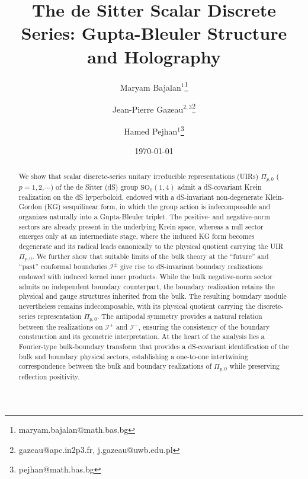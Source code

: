 \documentclass[aps,twocolumn,nofootinbib]{revtex4}
\begin{document}
\title{The de Sitter Scalar Discrete Series: Gupta-Bleuler Structure and Holography}


\author{Maryam Bajalan$^{1}$\footnote{maryam.bajalan@math.bas.bg}}

\author{Jean-Pierre Gazeau$^{2,3}$\footnote{gazeau@apc.in2p3.fr, j.gazeau@uwb.edu.pl}}

\author{Hamed Pejhan$^{1}$\footnote{pejhan@math.bas.bg}}




\date{\today}


\begin{abstract}
    {We show that scalar discrete-series unitary irreducible representations (UIRs) $\Pi_{p,0}$ ($p=1,2,\cdots$) of the de Sitter (dS) group $\mathrm{SO}_0(1,4)$ admit a dS-covariant Krein realization on the dS hyperboloid, endowed with a dS-invariant non-degenerate Klein-Gordon (KG) sesquilinear form, in which the group action is indecomposable and organizes naturally into a Gupta-Bleuler triplet. The positive- and negative-norm sectors are already present in the underlying Krein space, whereas a null sector emerges only at an intermediate stage, where the induced KG form becomes degenerate and its radical leads canonically to the physical quotient carrying the UIR $\Pi_{p,0}$. We further show that suitable limits of the bulk theory at the ``future'' and ``past'' conformal boundaries ${\mathcal{I}}^\pm$ give rise to dS-invariant boundary realizations endowed with induced kernel inner products. While the bulk negative-norm sector admits no independent boundary counterpart, the boundary realization retains the physical and gauge structures inherited from the bulk. The resulting boundary module nevertheless remains indecomposable, with its physical quotient carrying the discrete-series representation $\Pi_{p,0}$. The antipodal symmetry provides a natural relation between the realizations on ${\mathcal{I}}^+$ and ${\mathcal{I}}^-$, ensuring the consistency of the boundary construction and its geometric interpretation. At the heart of the analysis lies a Fourier-type bulk-boundary transform that provides a dS-covariant identification of the bulk and boundary physical sectors, establishing a one-to-one intertwining correspondence between the bulk and boundary realizations of $\Pi_{p,0}$ while preserving reflection positivity.}
\end{abstract}
\end{document}
